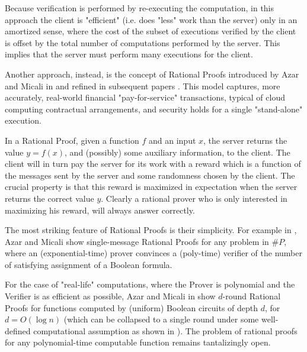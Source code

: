 Because verification is performed by re-executing the computation, in this approach the client is "efficient" (i.e. does "less" work than the server) only in an 
amortized sense, where the cost of the subset of executions verified by the client is offset by the total number of computations performed by the server. This implies that the server must perform many executions for the client. 

Another approach, instead, is the concept of {\sf Rational Proofs} introduced by Azar and Micali in \cite{am} and refined in subsequent papers \cite{am1,ratargs}. This model captures, more accurately, real-world financial "pay-for-service" transactions, typical of cloud computing contractual arrangements, and security
holds for a single "stand-alone" execution.

In a Rational Proof, given a function $f$ and an input $x$, the server returns the value $y=f(x)$, and (possibly) some auxiliary information, to the client. The client will in turn 
pay the server for its work with a reward which is a function of the messages 
sent by the server and some randomness chosen by the client.  The crucial 
property is that this reward is maximized in expectation when the server 
returns the correct value $y$. Clearly a rational prover who is only interested 
in maximizing his reward, will always answer correctly. 

The most striking feature of Rational Proofs is their simplicity. For example in \cite{am}, Azar and Micali show {\sf single-message} Rational Proofs for any problem in $\#P$, where an (exponential-time) prover convinces a (poly-time) verifier of the number of satisfying assignment of a Boolean formula. 

For the case of "real-life" computations, where the Prover is polynomial and the Verifier is as efficient as possible, Azar and Micali in \cite{am1} show $d$-round Rational Proofs for functions computed by (uniform) Boolean circuits of depth $d$, for $d=O(\log n)$ (which can be collapsed to a single round under some well-defined computational assumption as shown in \cite{ratargs}). The problem of rational proofs for any polynomial-time computable function remains tantalizingly open. 

